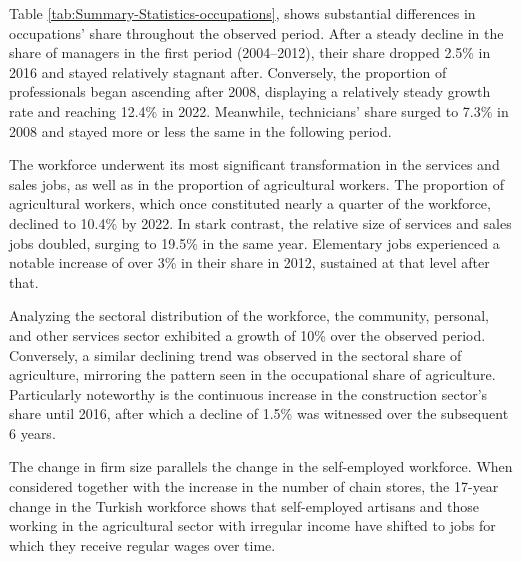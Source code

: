 \begin{center}

\par\end{center}

\vspace{-1cm}

\begin{onehalfspace}
Table \ref{tab:Summary-Statistics-occupations}, shows substantial
differences in occupations' share throughout the observed period.
After a steady decline in the share of managers in the first period
(2004--2012), their share dropped 2.5\% in 2016 and stayed relatively
stagnant after. Conversely, the proportion of professionals began
ascending after 2008, displaying a relatively steady growth rate and
reaching 12.4\% in 2022. Meanwhile, technicians' share surged to 7.3\%
in 2008 and stayed more or less the same in the following period.

The workforce underwent its most significant transformation in the
services and sales jobs, as well as in the proportion of agricultural
workers. The proportion of agricultural workers, which once constituted
nearly a quarter of the workforce, declined to 10.4\% by 2022. In
stark contrast, the relative size of services and sales jobs doubled,
surging to 19.5\% in the same year. Elementary jobs experienced a
notable increase of over 3\% in their share in 2012, sustained at
that level after that.

Analyzing the sectoral distribution of the workforce, the community,
personal, and other services sector exhibited a growth of 10\% over
the observed period. Conversely, a similar declining trend was observed
in the sectoral share of agriculture, mirroring the pattern seen in
the occupational share of agriculture. Particularly noteworthy is
the continuous increase in the construction sector's share until 2016,
after which a decline of 1.5\% was witnessed over the subsequent 6
years.

The change in firm size parallels the change in the self-employed
workforce. When considered together with the increase in the number
of chain stores, the 17-year change in the Turkish workforce shows
that self-employed artisans and those working in the agricultural
sector with irregular income have shifted to jobs for which they receive
regular wages over time.
\end{onehalfspace}
